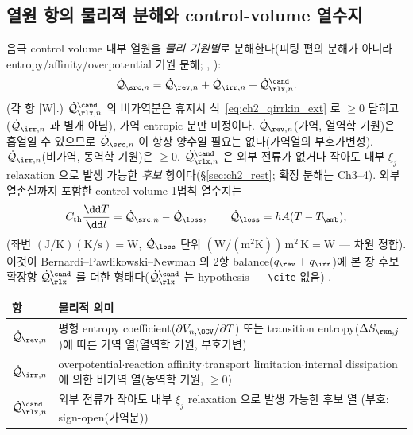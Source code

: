 \subsection{열원 항의 물리적 분해와 control-volume 열수지}\label{sec:ch2_decomp}
음극 control volume 내부 열원을 \emph{물리 기원별}로 분해한다(피팅 편의 분해가 아니라 entropy/affinity/overpotential
기원 분해; \cite{bernardi1985,rao1997}, ):
\begin{equation}
\dot{\mathcal Q}_{\src,n}=\dot{\mathcal Q}_{\rev,n}+\dot{\mathcal Q}_{\irr,n}+\dot{\mathcal Q}_{\rlx,n}^{\cand}.
\label{eq:ch2_srcdecomp}
\end{equation}
(각 항 [W].) $\dot{\mathcal Q}_{\rlx,n}^{\cand}$ 의 비가역분은 휴지서 식~\eqref{eq:ch2_qirrkin_ext} 로 $\ge0$ 닫히고
($\dot{\mathcal Q}_{\irr,n}$ 과 별개 아님), 가역 entropic 분만 미정이다.
$\dot{\mathcal Q}_{\rev,n}$(가역, 열역학 기원)은 흡열일 수 있으므로 $\dot{\mathcal Q}_{\src,n}$ 이 항상 양수일
필요는 없다(가역열의 부호가변성). $\dot{\mathcal Q}_{\irr,n}$(비가역, 동역학 기원)은 $\ge0$. $\dot{\mathcal Q}_{\rlx,n}^{\cand}$
은 외부 전류가 없거나 작아도 내부 $\xi_j$ relaxation 으로 발생 가능한 \emph{후보} 항이다(\S\ref{sec:ch2_rest};
확정 분해는 Ch3--4). 외부 열손실까지 포함한 control-volume 1법칙 열수지는
\begin{equation}
C_{\mathrm{th}}\frac{\dd T}{\dd t}=\dot{\mathcal Q}_{\src,n}-\dot{\mathcal Q}_{\loss},\qquad
\dot{\mathcal Q}_{\loss}=hA(T-T_\amb),
\label{eq:ch2_balance}
\end{equation}
(좌변 $\mathrm{(J/K)(K/s)=W}$, $\dot{\mathcal Q}_{\loss}$ 단위 $\mathrm{(W/(m^2K))\,m^2\,K=W}$ — 차원 정합).
이것이 Bernardi--Pawlikowski--Newman 의 2항 balance($q_\rev+q_\irr$)에 본 장 후보 확장항 $\dot{\mathcal Q}_{\rlx}^{\cand}$
를 더한 형태다($\dot{\mathcal Q}_{\rlx}^{\cand}$ 는 hypothesis — \texttt{\textbackslash cite} 없음) \cite{bernardi1985,rao1997}.
\begin{longtable}{>{\raggedright\arraybackslash}p{} >{\raggedright\arraybackslash}p{}}
\toprule 항 & 물리적 의미 \\ \midrule \endhead
$\dot{\mathcal Q}_{\rev,n}$ & 평형 entropy coefficient($\partial V_{n,\OCV}/\partial T$) 또는 transition entropy($\Delta S_{\rxn,j}$)에 따른 가역 열(열역학 기원, 부호가변) \\
$\dot{\mathcal Q}_{\irr,n}$ & overpotential$\cdot$reaction affinity$\cdot$transport limitation$\cdot$internal dissipation 에 의한 비가역 열(동역학 기원, $\ge0$) \\
$\dot{\mathcal Q}_{\rlx,n}^{\cand}$ & 외부 전류가 작아도 내부 $\xi_j$ relaxation 으로 발생 가능한 후보 열 (부호: sign-open(가역분)) \\
\bottomrule
\end{longtable}
